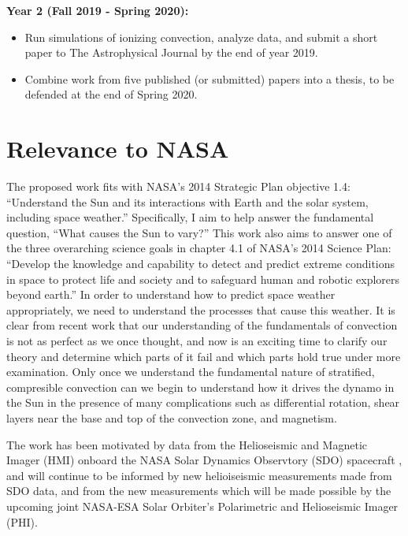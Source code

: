 \documentclass[aasms,12pt]{article}
\begin{document}
\textbf{Year 2 (Fall 2019 - Spring 2020):}
\begin{itemize}
\vspace{-0.2cm}
\item  Run simulations of ionizing convection, analyze data, and submit a short paper to The
Astrophysical Journal by the end of year 2019.
\vspace{-0.2cm}
\item Combine work from five published (or submitted) papers into a thesis, to be defended at the end of 
Spring 2020.
\end{itemize}

\section{Relevance to NASA} 
The proposed work fits with NASA's 2014 Strategic Plan objective
1.4:
``Understand the Sun and its interactions with Earth and the solar
system, including space weather.''  Specifically, I aim to help answer
the fundamental question, ``What causes the Sun to vary?'' 
This work also aims to answer one of the three overarching science goals
in chapter 4.1 of NASA's 2014 Science Plan: 
``Develop the
knowledge and capability to detect and predict extreme conditions in space to
protect life and society and to safeguard human and robotic explorers beyond
earth.'' In order to understand how to predict space weather appropriately, we
need to understand the processes that cause this weather.  It is clear from
recent work that our understanding of the fundamentals of convection is not as perfect
as we once thought, and now is an exciting time to clarify our theory and determine which
parts of it fail and which parts hold true under more examination.  Only once we understand
the fundamental nature of stratified, compresible convection can we begin to understand
how it drives the dynamo in the Sun in the presence of many complications such as
differential rotation, shear layers near the base and top of the convection zone, and
magnetism.

The work has been motivated by data from the Helioseismic and Magnetic Imager (HMI) onboard
the NASA Solar Dynamics Observtory (SDO) spacecraft 
\citep{hanasoge&all2012, greer&all2015, hathaway&all2015}, and will continue to be informed by
new helioiseismic measurements made from SDO data, and from the new measurements which will
be made possible by the upcoming joint NASA-ESA Solar Orbiter's Polarimetric and 
Helioseismic Imager (PHI).
\end{document}
